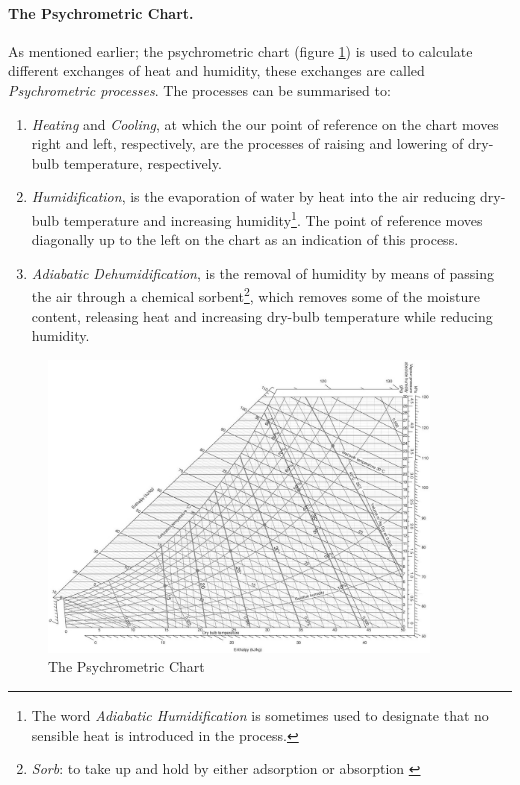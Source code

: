 \paragraph{The Psychrometric Chart.}As mentioned earlier; the psychrometric chart (figure \ref{PsychroChart}) is used to calculate different exchanges of heat and humidity, these exchanges are called \emph{Psychrometric processes}. The processes can be summarised to:
\begin{enumerate}
  \item \emph{Heating} and \emph{Cooling}, at which the our point of reference on the chart moves right and left, respectively, are the processes of raising and lowering of dry-bulb temperature, respectively.
  \item \emph{Humidification}, is the evaporation of water by heat into the air reducing dry-bulb temperature and increasing humidity\footnote{The word \emph{Adiabatic Humidification} is sometimes used to designate that no sensible heat is introduced in the process.}. The point of reference moves diagonally up to the left on the chart as an indication of this process.
  \item \emph{Adiabatic Dehumidification}, is the removal of humidity by means of passing the air through a chemical sorbent\footnote{\emph{Sorb}: to take up and hold by either adsorption or absorption \cite{merriam03}}, which removes some of the moisture content, releasing heat and increasing dry-bulb temperature while reducing humidity.
\end{enumerate}

\begin{figure} %
\centering
\includegraphics[width=0.9\textwidth]{./Images/1-PsychrometricChart}
\caption[The Psychrometiric Chart]{The Psychrometric Chart \cite{szokolay08} \label{PsychroChart}}
\end{figure}

